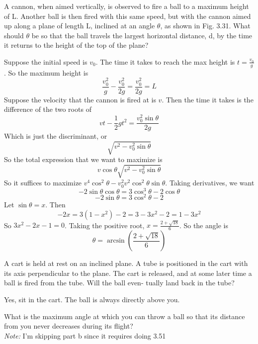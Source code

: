 \documentclass[11pt]{scrartcl}
\begin{document}
\begin{example}
  [3.48]
  A cannon, when aimed vertically, is observed to fire a ball to a maximum
  height of L. Another ball is then fired with this same speed, but with the
  cannon aimed up along a plane of length L, inclined at an angle $\theta$, as
  shown in Fig. 3.31. What should $\theta$ be so that the ball travels the largest
  horizontal distance, d, by the time it returns to the height of the top of
  the plane?
\end{example}
\begin{soln}
  Suppose the initial speed is $v_0$. The time it takes to reach the
  max height is $t=\frac{v_0}{g}$. So the maximum height is
  $$\frac{v_0^2}{g}-\frac{v_0^2}{2g}=\frac{v_0^2}{2g}=L$$
  Suppose the velocity that the cannon is fired at is $v$. Then the time
  it takes is the difference of the two roots of
  $$vt-\frac{1}{2}gt^2=\frac{v_0^2\sin\theta}{2g}$$
  Which is just the discriminant, or
  $$\sqrt{v^2-v_0^2\sin\theta}$$
  So the total expression that we want to maximize is
  $$v\cos\theta\sqrt{v^2-v_0^2\sin\theta}$$
  So it suffices to maximize $v^4\cos^2\theta-v_0^2v^2\cos^2\theta\sin\theta$.
  Taking derivatives, we want
  $$-2\sin\theta\cos\theta=3\cos^3\theta-2\cos\theta$$
  $$-2\sin\theta=3\cos^2\theta-2$$
  Let $\sin\theta=x$. Then
  $$-2x=3(1-x^2)-2=3-3x^2-2=1-3x^2$$
  So $3x^2-2x-1=0$. Taking the positive root, $x=\frac{2+\sqrt{18}}{6}$.
  So the angle is
  $$\theta=\arcsin\left(\frac{2+\sqrt{18}}{6}\right)$$
\end{soln}
\begin{example}
  [3.50]
  A cart is held at rest on an inclined plane. A tube is positioned in the
  cart with its axis perpendicular to the plane. The cart is released, and
  at some later time a ball is fired from the tube. Will the ball even-
  tually land back in the tube?
\end{example}
\begin{soln}
  Yes, sit in the cart. The ball is always directly above you.
\end{soln}
\begin{example}
  [3.52]
  What is the maximum angle at which you can throw a ball so that
  its distance from you never decreases during its flight?
  \\
  \textit{Note:} I'm skipping part b since it requires doing 3.51
\end{example}
\end{document}
